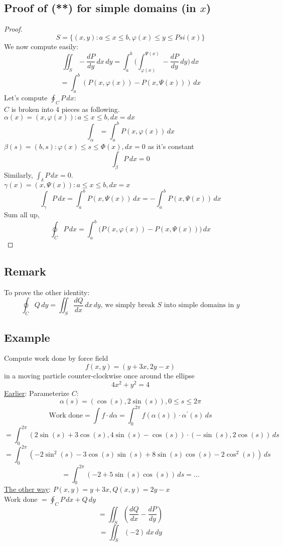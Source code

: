 \documentclass[12pt]{article}
\newcommand*\circled[1]{\tikz[baseline=(char.base)]{
    \node[shape=circle,draw,inner sep=2pt] (char) {#1};}}
\newcommand{\prm}{^\prime}
\newcommand{\phii}{\varphi}
\begin{document}
\subsection*{Proof of (**) for simple domains (in $x$)}
    \begin{proof}
        \[ S=\big\{(x,y): a\leq x\leq b, \phii(x)\leq y\leq Psi(x)\big\}\]
        We now compute easily: \\
        \[ \iint_S-\frac{dP}{dy}\,dx\,dy=\int_a^b\bigg(\int_{\phii(x)}^{\Psi(x)}-\frac{dP}{dy}\,dy\bigg)\,dx\]
        \[ = \int_a^b(P(x,\phii(x))-P(x,\Psi(x)))\,dx\]
        Let's compute $\oint_CP\,dx$: \\
        $C$ is broken into 4 pieces as following. \\
        \circled{I} $\alpha(x)=(x,\phii(x)): a\leq x\leq b, dx=dx$ \\
        \[ \int_{\alpha}=\int_a^bP(x,\phii(x))\,dx\]
        \circled{II} $\beta(s)=(b,s):\phii(x)\leq s\leq\Phi(x), dx=0$ as it's constant \\
        \[ \int_{\beta}P\,dx=0 \]
        Similarly, $\int_{\delta}P\,dx=0.$ \\
        \circled{III} $\gamma(x)=(x,\Psi(x)): a\leq x\leq b, dx=x$ \\
        \[ \int_{\gamma}P\,dx=\int_a^bP(x,\Psi(x))\,dx=-\int_a^bP(x,\Psi(x))\,dx \]
        Sum all up, \\
        \[ \oint_CP\,dx=\int_a^b\big(P(x,\phii(x))-P(x,\Psi(x))\big)\,dx \]
    \end{proof}
\subsection*{Remark}
    To prove the other identity: \\
    \[ \oint_CQ\,dy=\iint_S\frac{dQ}{dx}\,dx\,dy\text{, we simply break $S$ into simple domains in $y$} \]
\subsection*{Example}
    Compute work done by force field \\
    \[ f(x,y)=(y+3x, 2y-x) \]
    in a moving particle counter-clockwise once around the ellipse \\
    \[ 4x^2+y^2=4 \]
    \underline{Earlier}: Parameterize $C$: \\
    \[ \alpha(s)=(\cos(s),2\sin(s)), 0\leq s\leq 2\pi \]
    \[\text{Work done} = \int f\cdot d\alpha=\int_0^{2\pi}f(\alpha(s))\cdot\alpha\prm(s)\,ds \]
    \[ =\int_0^{2\pi}(2\sin(s)+3\cos(s),4\sin(s)-\cos(s))\cdot(-\sin(s),2\cos(s))\,ds \]
    \[ = \int_0^{2\pi}(-2\sin^2(s)-3\cos(s)\sin(s)+8\sin(s)\cos(s)-2\cos^2(s))\,ds \]
    \[ = \int_0^{2\pi}(-2+5\sin(s)\cos(s))\,ds =\dots \]
    \underline{The other way}: $P(x,y)=y+3x,Q(x,y)=2y-x$ \\
    Work done $=\oint_CP\,dx+Q\,dy$ \\
    \[ = \iint_S(\frac{dQ}{dx}-\frac{dP}{dy}) \]
    \[ = \iint_S(-2)\,dx\,dy \]
\end{document}
